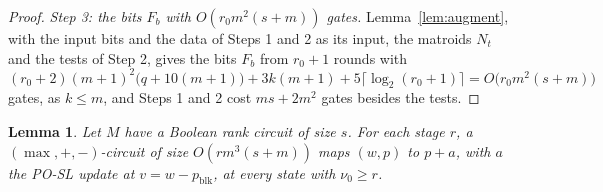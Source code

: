 \documentclass[11pt]{article}
\newtheorem{lemma}[theorem]{Lemma}
\newcommand{\blk}{\operatorname{blk}}
\begin{document}
\begin{proof}
\emph{Step 3: the bits $F_b$ with $O(r_0m^{2}(s+m))$ gates.}  Lemma~\ref{lem:augment}, with the input bits and
the data of Steps 1 and 2 as its input, the matroids $N_t$ and the tests of Step 2,
gives the bits $F_b$ from $r_0+1$ rounds with
\[
  (r_0+2)(m+1)^{2}\bigl(q+10(m+1)\bigr)+3k(m+1)+5\lceil\log_2(r_0+1)\rceil
  =O\bigl(r_0m^{2}(s+m)\bigr)
\]
gates, as $k\le m$, and Steps 1 and 2 cost $ms+2m^{2}$ gates besides the tests.
\end{proof}

\begin{lemma}
\label{lem:oneupdate}
Let $M$ have a Boolean rank circuit of size $s$.  For each stage $r$, a
$(\max,+,-)$-circuit of size $O(rm^{3}(s+m))$ maps
$(w,p)$ to $p+a$, with $a$ the PO-SL update at $v=w-p_{\blk}$, at every state
with $\nu_0\ge r$.
\end{lemma}
\end{document}
